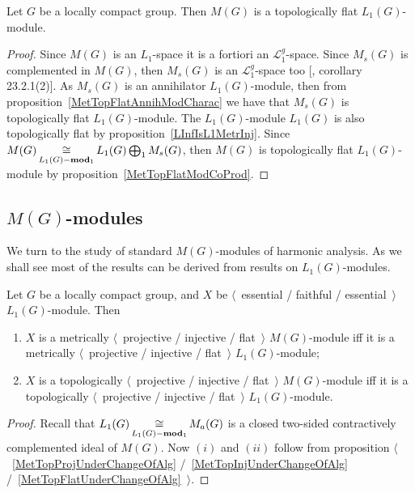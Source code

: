 \begin{proposition}\label{MeasAlgIsL1TopFlat} Let $G$ be a locally compact
group. Then $M(G)$ is a topologically flat $L_1(G)$-module.
\end{proposition}
\begin{proof} Since $M(G)$ is an $L_1$-space it is a fortiori an
$\mathscr{L}_1^g$-space. Since $M_s(G)$ is complemented in $M(G)$, then $M_s(G)$
is an $\mathscr{L}_1^g$-space too [\cite{DefFloTensNorOpId}, corollary
23.2.1(2)]. As $M_s(G)$ is an annihilator $L_1(G)$-module, then from
proposition~\ref{MetTopFlatAnnihModCharac} we have that $M_s(G)$ is
topologically flat $L_1(G)$-module. The $L_1(G)$-module $L_1(G)$ is also
topologically flat by proposition~\ref{LInfIsL1MetrInj}. Since
$M(G)\mathop{\mathbin{\cong}}\limits_{L_1(G)-\mathbf{mod}_1}L_1(G)\bigoplus_1 M_s(G)$, then $M(G)$ is
topologically flat $L_1(G)$-module by proposition~\ref{MetTopFlatModCoProd}.
\end{proof}


\subsection{
    \texorpdfstring{$M(G)$}{M(G)}-modules}\label{
SubSectionMGModules}

We turn to the study of standard $M(G)$-modules of harmonic analysis. As we
shall see most of the results can be derived from results on $L_1(G)$-modules.

\begin{proposition}\label{MGMetTopProjInjFlatRedToL1} Let $G$ be a locally
compact group, and $X$ be $\langle$~essential / faithful / essential~$\rangle$
$L_1(G)$-module. Then

\begin{enumerate}[label = (\roman*)]
    \item $X$ is a metrically $\langle$~projective / injective / flat~$\rangle$
    $M(G)$-module iff it is a metrically $\langle$~projective / injective /
    flat~$\rangle$ $L_1(G)$-module;

    \item $X$ is a topologically $\langle$~projective / injective / flat~$\rangle$
    $M(G)$-module iff it is a topologically $\langle$~projective / injective /
    flat~$\rangle$ $L_1(G)$-module.
\end{enumerate}
\end{proposition}
\begin{proof} Recall that $L_1(G)\mathop{\mathbin{\cong}}\limits_{L_1(G)-\mathbf{mod}_1}M_a(G)$ is a
closed two-sided contractively complemented ideal of $M(G)$. Now $(i)$ and $(ii)$
follow from proposition $\langle$~\ref{MetTopProjUnderChangeOfAlg}
/~\ref{MetTopInjUnderChangeOfAlg}  /~\ref{MetTopFlatUnderChangeOfAlg}~$\rangle$.
\end{proof} 

